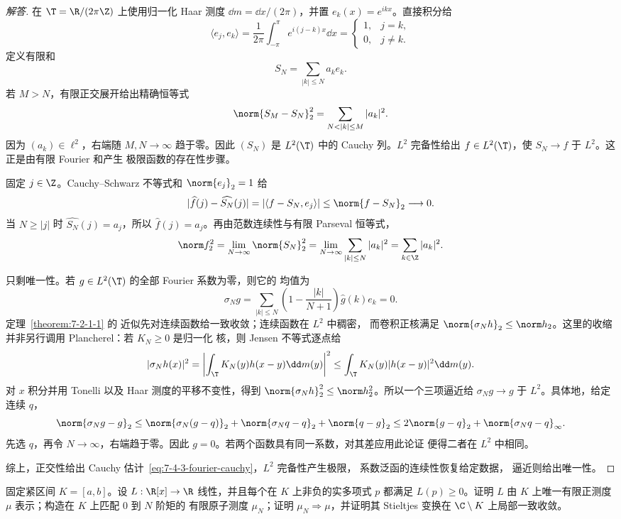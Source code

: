 \begin{proof}[解答]
在 $\T=\R/(2\pi\Z)$ 上使用归一化 Haar 测度 $\dd m=\dd x/(2\pi)$，并置
$e_k(x)=e^{ikx}$。直接积分给
\[
 \langle e_j,e_k\rangle
 =\frac1{2\pi}\int_{-\pi}^{\pi}e^{i(j-k)x}\dd x
 =\begin{cases}1,&j=k,\\0,&j\ne k.\end{cases}
\]
定义有限和
\[
 S_N=\sum_{|k|\le N}a_ke_k.
\]
若 $M>N$，有限正交展开给出精确恒等式
\begin{equation}\label{eq:7-4-3-fourier-cauchy}
 \norm{S_M-S_N}_2^2=\sum_{N<|k|\le M}|a_k|^2.
\end{equation}
因为 $(a_k)\in\ell^2$，右端随 $M,N\to\infty$ 趋于零。因此 $(S_N)$ 是 $L^2(\T)$ 中的 Cauchy
列。$L^2$ 完备性给出 $f\in L^2(\T)$，使 $S_N\to f$ 于 $L^2$。这正是由有限 Fourier 和产生
极限函数的存在性步骤。

固定 $j\in\Z$。Cauchy--Schwarz 不等式和 $\norm{e_j}_2=1$ 给
\[
 |\widehat f(j)-\widehat{S_N}(j)|
 =|\langle f-S_N,e_j\rangle|
 \le\norm{f-S_N}_2\longrightarrow0.
\]
当 $N\ge|j|$ 时 $\widehat{S_N}(j)=a_j$，所以 $\widehat f(j)=a_j$。再由范数连续性与有限
Parseval 恒等式，
\[
 \norm f_2^2=\lim_{N\to\infty}\norm{S_N}_2^2
 =\lim_{N\to\infty}\sum_{|k|\le N}|a_k|^2
 =\sum_{k\in\Z}|a_k|^2.
\]

只剩唯一性。若 $g\in L^2(\T)$ 的全部 Fourier 系数为零，则它的 \Fejer{} 均值为
\[
 \sigma_Ng
 =\sum_{|k|\le N}\left(1-\frac{|k|}{N+1}\right)\widehat g(k)e_k=0.
\]
定理~\ref{theorem:7-2-1-1} 的 \Fejer{} 近似先对连续函数给一致收敛；连续函数在 $L^2$ 中稠密，
而卷积正核满足 $\norm{\sigma_Nh}_2\le\norm h_2$。这里的收缩并非另行调用 Plancherel：若
$K_N\geq0$ 是归一化 \Fejer{} 核，则 Jensen 不等式逐点给
\[
 |\sigma_Nh(x)|^2
 =\left|\int_\T K_N(y)h(x-y)\dd m(y)\right|^2
 \leq\int_\T K_N(y)|h(x-y)|^2\dd m(y).
\]
对 $x$ 积分并用 Tonelli 以及 Haar 测度的平移不变性，得到
$\norm{\sigma_Nh}_2^2\leq\norm h_2^2$。所以一个三项逼近给
$\sigma_Ng\to g$ 于 $L^2$。具体地，给定连续 $q$，
\[
 \norm{\sigma_Ng-g}_2
 \le\norm{\sigma_N(g-q)}_2+\norm{\sigma_Nq-q}_2+\norm{q-g}_2
 \le2\norm{g-q}_2+\norm{\sigma_Nq-q}_\infty.
\]
先选 $q$，再令 $N\to\infty$，右端趋于零。因此 $g=0$。若两个函数具有同一系数，对其差应用此论证
便得二者在 $L^2$ 中相同。

综上，正交性给出 Cauchy 估计~\eqref{eq:7-4-3-fourier-cauchy}，$L^2$ 完备性产生极限，
系数泛函的连续性恢复给定数据，\Fejer{} 逼近则给出唯一性。
\end{proof}

\begin{problem}\label{problem:7-4-3-3}
固定紧区间 $K=[a,b]$。设 $L:\R[x]\to\R$ 线性，并且每个在 $K$ 上非负的实多项式 $p$ 都满足
$L(p)\ge0$。证明 $L$ 由 $K$ 上唯一有限正测度 $\mu$ 表示；构造在 $K$ 上匹配 $0$ 到 $N$ 阶矩的
有限原子测度 $\mu_N$；证明 $\mu_N\Rightarrow\mu$，并证明其 Stieltjes 变换在
$\C\setminus K$ 上局部一致收敛。
\end{problem}

